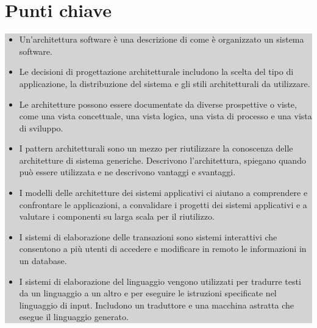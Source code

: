 \section{Punti chiave}
\begin{center}
\begin{minipage}{\textwidth}
\colorbox{lightgray}{
\parbox{\linewidth}{
\begin{itemize}
    \item Un'architettura software è una descrizione di come è organizzato un sistema software.
    \item Le decisioni di progettazione architetturale includono la scelta del tipo di applicazione, la distribuzione del sistema e gli stili architetturali da utilizzare.
    \item Le architetture possono essere documentate da diverse prospettive o viste, come una vista concettuale, una vista logica, una vista di processo e una vista di sviluppo.
    \item I pattern architetturali sono un mezzo per riutilizzare la conoscenza delle architetture di sistema generiche. Descrivono l'architettura, spiegano quando può essere utilizzata e ne descrivono vantaggi e svantaggi.
    \item I modelli delle architetture dei sistemi applicativi ci aiutano a comprendere e confrontare le applicazioni, a convalidare i progetti dei sistemi applicativi e a valutare i componenti su larga scala per il riutilizzo.
    \item I sistemi di elaborazione delle transazioni sono sistemi interattivi che consentono a più utenti di accedere e modificare in remoto le informazioni in un database.
    \item I sistemi di elaborazione del linguaggio vengono utilizzati per tradurre testi da un linguaggio a un altro e per eseguire le istruzioni specificate nel linguaggio di input. Includono un traduttore e una macchina astratta che esegue il linguaggio generato.
\end{itemize}
}}
\end{minipage}
\end{center}